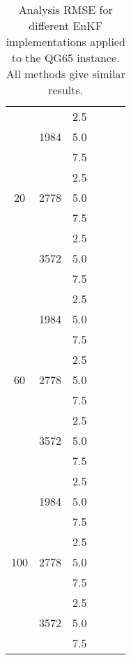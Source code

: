 \documentclass[12pt]{article}
\begin{document}
\begin{table}[H]
\centering
{\footnotesize
\begin{tabular}{|c|c|c|c|c|c|} \hline
 &  &  &  &  &  \\ \hline
\multirow{9}{*}{20} &  \multirow{3}{*}{1984}  & 2.5 &  &  &  \\
& & 5.0 &  &  &   \\ 
& & 7.5 &  &  &   \\ 
\cline{2-6}
&  \multirow{3}{*}{2778}  & 2.5 &  &  &  \\
& & 5.0 &  &  &   \\ 
& & 7.5 &  &  &   \\ 
\cline{2-6}
&  \multirow{3}{*}{3572}  & 2.5 &  &  &  \\
& & 5.0 &  &  &   \\ 
& & 7.5 &  &  &   \\ 
\cline{1-6}
\multirow{9}{*}{60} &  \multirow{3}{*}{1984}  & 2.5 &  &  &  \\
& & 5.0 &  &  &   \\ 
& & 7.5 &  &  &   \\ 
\cline{2-6}
&  \multirow{3}{*}{2778}  & 2.5 &  &  &  \\
& & 5.0 &  &  &   \\ 
& & 7.5 &  &  &   \\ 
\cline{2-6}
&  \multirow{3}{*}{3572}  & 2.5 &  &  &  \\
& & 5.0 &  &  &   \\ 
& & 7.5 &  &  &   \\ 
\cline{1-6}
\multirow{9}{*}{100} &  \multirow{3}{*}{1984}  & 2.5 &  &  &  \\
& & 5.0 &  &  &   \\ 
& & 7.5 &  &  &   \\ 
\cline{2-6}
&  \multirow{3}{*}{2778}  & 2.5 &  &  &  \\
& & 5.0 &  &  &   \\ 
& & 7.5 &  &  &   \\ 
\cline{2-6}
&  \multirow{3}{*}{3572}  & 2.5 &  &  &  \\
& & 5.0 &  &  &   \\ 
& & 7.5 &  &  &   \\ 
\hline
\end{tabular}
}
\caption{Analysis RMSE for different EnKF implementations applied to the QG65 instance.
All methods give similar results. }
\label{Tab:QG65-Results-RMSE}
\end{table}
\end{document}
